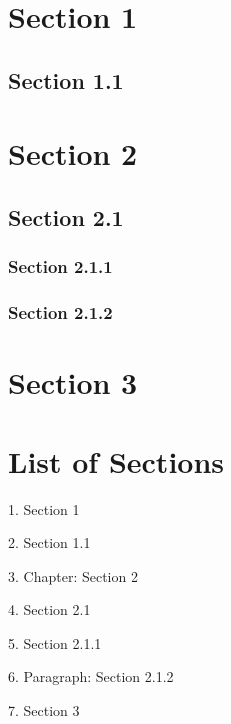 \hypertarget{sec:1}{%
\section{Section 1}\label{sec:1}}

\hypertarget{sec:11}{%
\subsection{Section 1.1}\label{sec:11}}

\hypertarget{sec:2}{%
\section{Section 2}\label{sec:2}}

\hypertarget{sec:21}{%
\subsection{Section 2.1}\label{sec:21}}

\hypertarget{sec:211}{%
\subsubsection{Section 2.1.1}\label{sec:211}}

\hypertarget{sec:212}{%
\subsubsection{Section 2.1.2}\label{sec:212}}

\hypertarget{section-3}{%
\section{Section 3}\label{section-3}}

\section{List of Sections}

1. Section 1

2. Section 1.1

3. Chapter: Section 2

4. Section 2.1

5. Section 2.1.1

6. Paragraph: Section 2.1.2

7. Section 3
